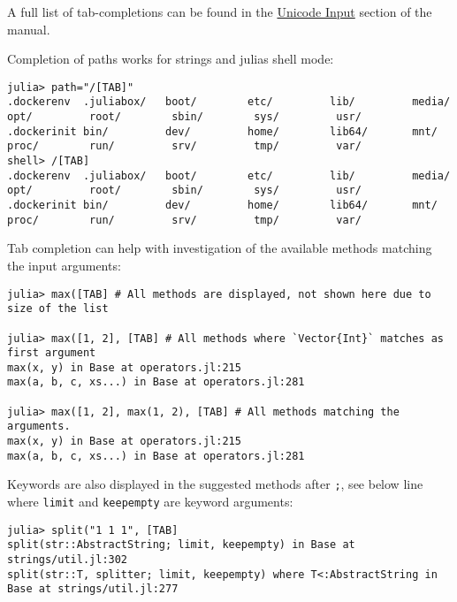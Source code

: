 A full list of tab-completions can be found in the \href{@ref}{Unicode Input} section of the manual.



Completion of paths works for strings and julia{\textquotesingle}s shell mode:




\begin{verbatim}
julia> path="/[TAB]"
.dockerenv  .juliabox/   boot/        etc/         lib/         media/       opt/         root/        sbin/        sys/         usr/
.dockerinit bin/         dev/         home/        lib64/       mnt/         proc/        run/         srv/         tmp/         var/
shell> /[TAB]
.dockerenv  .juliabox/   boot/        etc/         lib/         media/       opt/         root/        sbin/        sys/         usr/
.dockerinit bin/         dev/         home/        lib64/       mnt/         proc/        run/         srv/         tmp/         var/
\end{verbatim}



Tab completion can help with investigation of the available methods matching the input arguments:




\begin{verbatim}
julia> max([TAB] # All methods are displayed, not shown here due to size of the list

julia> max([1, 2], [TAB] # All methods where `Vector{Int}` matches as first argument
max(x, y) in Base at operators.jl:215
max(a, b, c, xs...) in Base at operators.jl:281

julia> max([1, 2], max(1, 2), [TAB] # All methods matching the arguments.
max(x, y) in Base at operators.jl:215
max(a, b, c, xs...) in Base at operators.jl:281
\end{verbatim}



Keywords are also displayed in the suggested methods after \texttt{;}, see below line where \texttt{limit} and \texttt{keepempty} are keyword arguments:




\begin{verbatim}
julia> split("1 1 1", [TAB]
split(str::AbstractString; limit, keepempty) in Base at strings/util.jl:302
split(str::T, splitter; limit, keepempty) where T<:AbstractString in Base at strings/util.jl:277
\end{verbatim}



